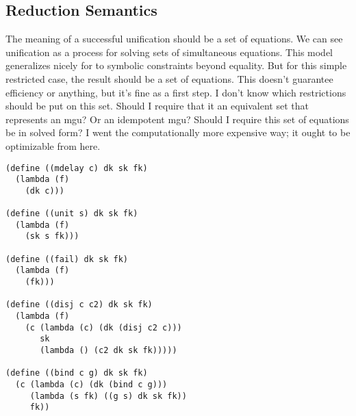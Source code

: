 \documentclass[11pt,twoside]{article}
\numberwithin{equation}{subsection} %
\begin{document}
\subsection{Reduction Semantics}


The meaning of a successful unification should be a set of
equations. We can see unification as a process for solving sets of
simultaneous equations. This model generalizes nicely for to symbolic
constraints beyond equality. But for this simple restricted case, the
result should be a set of equations. This doesn't guarantee efficiency
or anything, but it's fine as a first step. I don't know which
restrictions should be put on this set. Should I require that it an
equivalent set that represents an mgu? Or an idempotent mgu? Should I
require this set of equations be in solved form? I went the
computationally more expensive way; it ought to be optimizable from
here.





\begin{verbatim}
(define ((mdelay c) dk sk fk)
  (lambda (f) 
    (dk c)))

(define ((unit s) dk sk fk)
  (lambda (f) 
    (sk s fk)))

(define ((fail) dk sk fk)
  (lambda (f)
    (fk)))

(define ((disj c c2) dk sk fk)
  (lambda (f)
    (c (lambda (c) (dk (disj c2 c)))
       sk
       (lambda () (c2 dk sk fk)))))

(define ((bind c g) dk sk fk)
  (c (lambda (c) (dk (bind c g)))
     (lambda (s fk) ((g s) dk sk fk))
     fk))
\end{verbatim}
\end{document}
